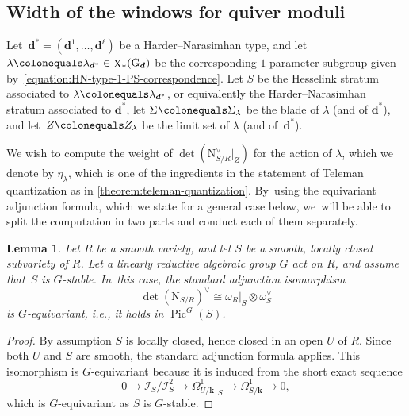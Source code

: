 \documentclass[11pt]{article}
\theoremstyle{plain}
\newtheorem{lemma}[theorem]{Lemma}
\theoremstyle{definition}
\DeclareMathOperator\characters{X}
\DeclareMathOperator\Pic{Pic}
\newcommand\blade[1][]{\Sigma_{#1}}
\newcommand\field{\mathbf{k}}
\newcommand\group[1][\tuple{d}]{\mathrm{G}_{#1}}
\newcommand\limitset[1][\lambda]{Z_{#1}}
\newcommand\normal{\ensuremath{\mathrm{N}}}
\newcommand\tuple[1]{\ensuremath{{\boldsymbol{#1}}}}
\begin{document}
\subsection{Width of the windows for quiver moduli}
\label{subsection:width}
Let~$\tuple{d}^*=(\tuple{d}^1,\ldots,\tuple{d}^\ell)$ be a Harder--Narasimhan type,
and let $\lambda \colonequals \lambda_{\tuple{d}^*} \in \characters_*({\group})$ be
the corresponding $1$\nobreakdash-parameter subgroup given by~\eqref{equation:HN-type-1-PS-correspondence}.
Let $S$ be the Hesselink stratum associated to $\lambda\colonequals\lambda_{\tuple{d}^*}$,
or equivalently the Harder--Narasimhan stratum associated to $\tuple{d}^*$,
let $\blade\colonequals\blade[\lambda]$ be the blade of $\lambda$ (and of $\tuple{d}^*$),
and let~$\limitset[]\colonequals\limitset[\lambda]$ be the limit set of $\lambda$ (and of~$\tuple{d}^*$).

We wish to compute the weight of $\det(\normal_{S/R}^\vee|_Z)$
for the action of $\lambda$,
which we denote by $\eta_\lambda$,
which is one of the ingredients in the statement of Teleman quantization as in \cref{theorem:teleman-quantization}. By~using the equivariant adjunction formula,
which we state for a general case below, we~will be able to split the computation in two parts and conduct each of them separately.
\begin{lemma}
\label{lemma:determinant-normal-bundle-sequence}
Let $R$ be a smooth variety,
and let $S$ be a smooth, locally closed subvariety of $R$.
Let a linearly reductive algebraic group $G$ act on $R$,
and assume that~$S$ is $G$-stable. In~this case, the standard adjunction isomorphism
\begin{equation}
\label{equation:equivariant-adjunction}
\det(\normal_{S/R})^\vee \cong \omega_R|_S \otimes \omega_S^\vee
\end{equation}
is $G$-equivariant, i.e., it holds in $\Pic^G(S)$.
\end{lemma}

\begin{proof}
By assumption $S$ is locally closed,
hence closed in an open $U$ of $R$.
Since both $U$ and $S$ are smooth,
the standard adjunction formula applies. This isomorphism is $G$-equivariant because it is induced from the short exact sequence
\begin{equation*}
0 \to \mathcal{I}_{S}/\mathcal{I}^2_{S} \to \Omega^{1}_{U/\field}|_{S} \to \Omega^{1}_{S/\field} \to 0,
\end{equation*}
which is $G$-equivariant as $S$ is $G$-stable.
\end{proof}
\end{document}
